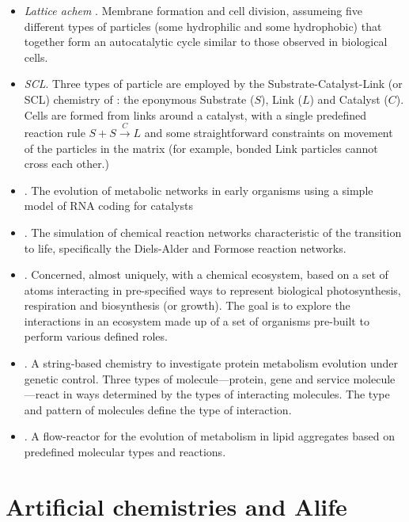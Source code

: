 \begin{itemize}
\item
\emph{Lattice \gls{achem}} \parencite{Madina2003,Ono2000}. Membrane formation and cell division, assumeing five different types of particles (some hydrophilic and some hydrophobic) that together form an autocatalytic cycle similar to those observed in biological cells.
\item
\emph{SCL}. Three types of particle are employed by the Substrate-Catalyst-Link (or SCL) chemistry of \textcite{Varela:1974qd,Suzuki2008}: the eponymous Substrate ($S$), Link ($L$) and Catalyst ($C$). Cells are formed from links around a catalyst, with a single predefined reaction rule $S + S\xrightarrow{C} L$ and some straightforward constraints on movement of the particles in the matrix (for example, bonded Link particles cannot cross each other.)
\item
\emph{\Textcite{Flamm2010, Ullrich2010}}. The evolution of metabolic networks in early organisms using a simple model of RNA coding for catalysts
\item \emph{\Textcite{Hogerl2010}}. The simulation of chemical reaction networks characteristic of the transition to life, specifically the Diels-Alder and Formose reaction networks.
\item
\emph{\Textcite{Dorin:2006fk}}. Concerned, almost uniquely, with a chemical ecosystem, based on a set of atoms interacting in pre-specified ways to represent biological photosynthesis, respiration and biosynthesis (or growth). The goal is to explore the interactions in an ecosystem made up of a set of organisms pre-built to perform various defined roles.
\item
\emph{\Textcite{Gardiner2007}}. A string-based chemistry to investigate protein metabolism evolution under genetic control. Three types of molecule---protein, gene and service molecule---react in ways determined by the types of interacting molecules. The type and pattern of molecules define the type of interaction.
\item
\emph{\Textcite{Fernando:2008xy,Fernando:2007pf}}. A flow-reactor for the evolution of metabolism in lipid aggregates based on predefined molecular types and reactions.
\end{itemize}

\section{Artificial chemistries and Alife}\label{artificial-chemistries-and-alife}

